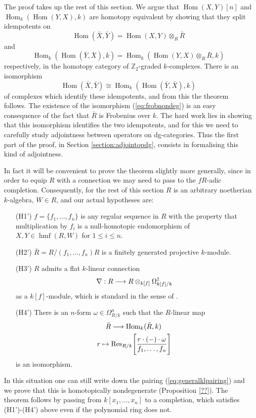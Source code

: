 \documentclass{compositio}
\theoremstyle{definition}
\newtheorem{remark}[theorem]{Remark}
\numberwithin{equation}{section}
\newcommand{\Ress}[1]{\res_{#1}\!}
\def\res{\operatorname{Res}}
\def\Hom{\operatorname{Hom}}
\DeclareMathOperator{\hmf}{hmf}
\begin{document}

The proof takes up the rest of this section. We argue that $\Hom(X,Y)[n]$ and $\Hom_k(\Hom(Y,X),k)$ are homotopy equivalent by showing that they split idempotents on
\[
\Hom(\bar{X},\bar{Y}) = \Hom(X,Y) \otimes_R \bar{R}
\]
and
\[
\Hom_k( \Hom(\bar{Y}, \bar{X}), k) = \Hom_k( \Hom(Y,X) \otimes_R \bar{R}, k )
\]
respectively, in the homotopy category of $\mathbb{Z}_2$-graded $k$-complexes. There is an isomorphism
\begin{equation}\label{eq:frobnondeg}
\Hom(\bar{X}, \bar{Y}) \cong \Hom_k( \Hom(\bar{Y}, \bar{X}), k)
\end{equation}
of complexes which identify these idempotents, and from this the theorem follows. The existence of the isomorphism (\ref{eq:frobnondeg}) is an easy consequence of the fact that $\bar{R}$ is Frobenius over $k$. The hard work lies in showing that this isomorphism identifies the two idempotents, and for this we need to carefully study adjointness between operators on dg-categories. Thus the first part of the proof, in Section \ref{section:adjointopdg}, consists in formalising this kind of adjointness.

In fact it will be convenient to prove the theorem slightly more generally, since in order to equip $R$ with a connection we may need to pass to the $fR$-adic completion. Consequently, for the rest of this section $R$ is an arbitrary noetherian $k$-algebra, $W \in R$, and our actual hypotheses are:
\begin{itemize}
\item[(H1')] $f = \{ f_1,\ldots,f_n \}$ is any regular sequence in $R$ with the property that multiplication by $f_i$ is a null-homotopic endomorphism of $X,Y \in \hmf(R,W)$ for $1 \le i \le n$.
\item[(H2')] $\bar{R} = R/(f_1,\ldots,f_n)R$ is a finitely generated projective $k$-module.
\item[(H3')] $R$ admits a flat $k$-linear connection
\[
\nabla: R \longrightarrow R \otimes_{k[f]} \Omega^1_{k[f]/k}
\]
as a $k[f]$-module, which is standard in the sense of \cite{??}.
\item[(H4')] There is an $n$-form $\omega \in \Omega^n_{R/k}$ such that the $R$-linear map
\begin{gather*}
\bar{R} \lto \Hom_k( \bar{R}, k)\,\\
r \mapsto \Ress{R/k}\Bigg[ \frac{r \cdot (-) \cdot \omega}{ f_1, \ldots, f_n} \Bigg]
\end{gather*}
is an isomorphism.
\end{itemize}
In this situation one can still write down the pairing (\ref{eq:generalklpairing}) and we prove that this is homotopically nondegenerate (Proposition \ref{??}). The theorem follows by passing from $k[x_1,\ldots,x_n]$ to a completion, which satisfies (H1')-(H4') above even if the polynomial ring does not.
\end{document}
